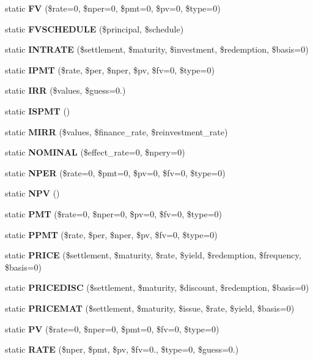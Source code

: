 \begin{DoxyCompactItemize}
\item 
static {\bfseries F\+V} (\$rate=0, \$nper=0, \$pmt=0, \$pv=0, \$type=0)\label{class_p_h_p_excel___calculation___financial_ac7e7c435e3f1e6d768f486d9edf51a4a}

\item 
static {\bf F\+V\+S\+C\+H\+E\+D\+U\+L\+E} (\$principal, \$schedule)
\item 
static {\bf I\+N\+T\+R\+A\+T\+E} (\$settlement, \$maturity, \$investment, \$redemption, \$basis=0)
\item 
static {\bf I\+P\+M\+T} (\$rate, \$per, \$nper, \$pv, \$fv=0, \$type=0)
\item 
static {\bf I\+R\+R} (\$values, \$guess=0.)
\item 
static {\bf I\+S\+P\+M\+T} ()
\item 
static {\bf M\+I\+R\+R} (\$values, \$finance\+\_\+rate, \$reinvestment\+\_\+rate)
\item 
static {\bf N\+O\+M\+I\+N\+A\+L} (\$effect\+\_\+rate=0, \$npery=0)
\item 
static {\bf N\+P\+E\+R} (\$rate=0, \$pmt=0, \$pv=0, \$fv=0, \$type=0)
\item 
static {\bf N\+P\+V} ()
\item 
static {\bf P\+M\+T} (\$rate=0, \$nper=0, \$pv=0, \$fv=0, \$type=0)
\item 
static {\bf P\+P\+M\+T} (\$rate, \$per, \$nper, \$pv, \$fv=0, \$type=0)
\item 
static {\bfseries P\+R\+I\+C\+E} (\$settlement, \$maturity, \$rate, \$yield, \$redemption, \$frequency, \$basis=0)\label{class_p_h_p_excel___calculation___financial_a9ecc353634441471b00498d96dfd52cf}

\item 
static {\bf P\+R\+I\+C\+E\+D\+I\+S\+C} (\$settlement, \$maturity, \$discount, \$redemption, \$basis=0)
\item 
static {\bf P\+R\+I\+C\+E\+M\+A\+T} (\$settlement, \$maturity, \$issue, \$rate, \$yield, \$basis=0)
\item 
static {\bf P\+V} (\$rate=0, \$nper=0, \$pmt=0, \$fv=0, \$type=0)
\item 
static {\bfseries R\+A\+T\+E} (\$nper, \$pmt, \$pv, \$fv=0., \$type=0, \$guess=0.)\label{class_p_h_p_excel___calculation___financial_a8c3735a6234efc79451fbc1563ab9f27}


\end{DoxyCompactItemize}
